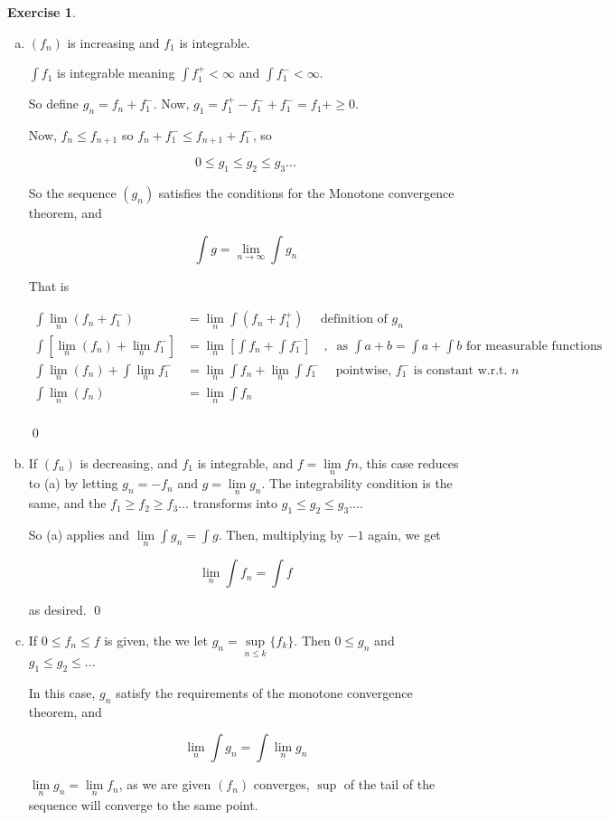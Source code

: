 \documentclass[11pt,oneside]{article}
\numberwithin{equation}{section}
\theoremstyle{definition}
\newtheorem{exercise}{Exercise}
\def\limn{\lim \limits _n}
\begin{document}
\begin{exercise}
  \begin{enumerate}[(a)]
  \item
    $(f_n) $ is increasing and $f_1$ is integrable.
    
    $\int f_1$ is integrable meaning $ \int f_1^+  < \infty $ and $\int f_1 ^- <  \infty$.
    
    So define $g_n = f_n + f_1^-$.  Now, $g_1 = f_1^+ - f_1^- + f_1^- = f_1+ \geq 0$.
    
    Now, $f_n \leq f_{n+1}$ so $f_n + f_1^- \leq f_{n+1} + f_1^-$, so
    
    \[
    0 \leq g_1 \leq g_2 \leq g_3 ...
    \]
    
    So the sequence $(g_n)$ satisfies the conditions for the Monotone convergence theorem, and
    
    \[
    \int g = \lim_{n \to \infty} \int g_n
    \]
    
    That is
    
    \begin{align*}
      \int \limn (f _n + f_1 ^ -) &= \limn \int (f_n + f_1^+) \quad \textrm { definition of } g_n \\ 
      \int \left[ \limn ( f_n) + \limn f_1^- \right] &= \limn \left[ \int f_n + \int f_1^- \right] \quad ,  \ \textrm{ as } \int a + b = \int a + \int b \textrm{ for measurable functions } \\
      \int \limn ( f_n) + \int \limn {f_1^-} &= \limn \int f_n + \limn \int f_1^- \quad \textrm{ pointwise, } f_1^- \textrm{ is constant w.r.t. } n \\
      \int \limn ( f_n) & = \limn \int f_n  \\
    \end{align*}
    
    \qed
    
  \item
    
    If $(f_n)$ is decreasing, and $f_1$ is integrable, and $f = \limn fn$, this case reduces to (a) by letting $g_n = - f_n$ and $g = \limn g_n$.  The integrability
    condition is the same, and the $f_1 \geq f_2 \geq f_3 ...$ transforms into $g_1 \leq g_2 \leq g_3 ...$.
    
    So (a) applies and $ \limn \int g_n = \int g$.  Then, multiplying by $-1$ again, we get
    
    \[
    \limn \int f_n = \int f
    \]
    
    as desired. \qed
    
  \item
    If $0 \leq f_n \leq f$ is given, the we let $g_n = \sup \limits _ {n \leq k} \{f_k\}$.  Then $0 \leq g_n$ and $g_1 \leq g_2 \leq ...$

    In this case, $g_n$ satisfy the requirements of the monotone convergence theorem, and

    \[
    \limn \int g_n = \int \limn g_n
    \]

    $ \limn g_n = \limn f_n$, as we are given $(f_n)$ converges,
    $\sup$ of the tail of the sequence will converge to the same
    point.


\end{enumerate}
  
\end{exercise}
\end{document}
